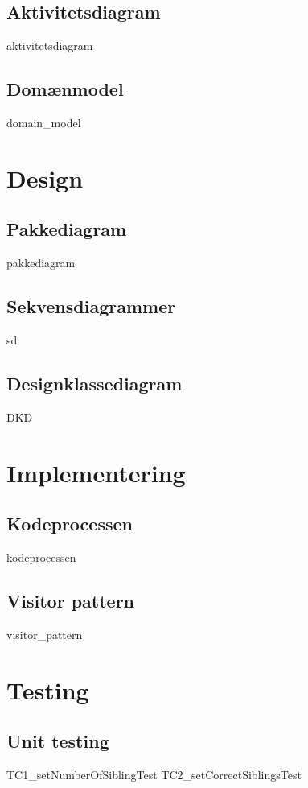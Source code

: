 \documentclass{article}
\begin{document}
{\subsection{Aktivitetsdiagram}
{aktivitetsdiagram}
\newpage
\subsection{Domænmodel}
{domain_model}
\newpage

\section{Design}

\subsection{Pakkediagram}
{pakkediagram}
\newpage
\subsection{Sekvensdiagrammer}
{sd}
\newpage
\subsection{Designklassediagram}
{DKD}
\newpage
\section{Implementering}
\subsection{Kodeprocessen}
{kodeprocessen}
\subsection{Visitor pattern}
{visitor_pattern}
\newpage
\section{Testing}
\subsection{Unit testing}
{TC1_setNumberOfSiblingTest}
{TC2_setCorrectSiblingsTest}

}
\end{document}
